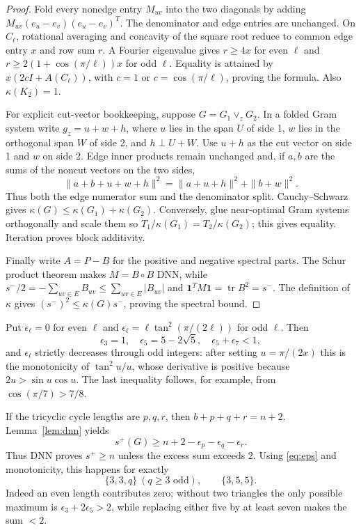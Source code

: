 \documentclass[11pt]{article}
\newcommand{\tr}{\operatorname{tr}}
\newcommand{\one}{\mathbf 1}
\begin{document}
\begin{proof}
Fold every nonedge entry $M_{uv}$ into the two diagonals by adding
$M_{uv}(e_u-e_v)(e_u-e_v)^T$.  The denominator and edge entries are
unchanged.  On $C_\ell$, rotational averaging and concavity of the square
root reduce to common edge entry $x$ and row sum $r$.  A Fourier eigenvalue
gives $r\geq4x$ for even $\ell$ and
$r\geq2(1+\cos(\pi/\ell))x$ for odd $\ell$.  Equality is attained by
$x(2cI+A(C_\ell))$, with $c=1$ or $c=\cos(\pi/\ell)$, proving the formula.
Also $\kappa(K_2)=1$.

For explicit cut-vector bookkeeping, suppose $G=G_1\vee_zG_2$.  In a folded
Gram system write $g_z=u+w+h$, where $u$ lies in the span $U$ of side 1,
$w$ lies in the orthogonal span $W$ of side 2, and $h\perp U+W$.  Use $u+h$
as the cut vector on side 1 and $w$ on side 2.  Edge inner products remain
unchanged and, if $a,b$ are the sums of the noncut vectors on the two sides,
\[
 \|a+b+u+w+h\|^2=\|a+u+h\|^2+\|b+w\|^2.
\]
Thus both the edge numerator sum and the denominator split.  Cauchy--Schwarz
gives $\kappa(G)\leq\kappa(G_1)+\kappa(G_2)$.  Conversely, glue near-optimal
Gram systems orthogonally and scale them so
$T_1/\kappa(G_1)=T_2/\kappa(G_2)$; this gives equality.  Iteration proves
block additivity.

Finally write $A=P-B$ for the positive and negative spectral parts.  The
Schur product theorem makes $M=B\circ B$ DNN, while
$s^-/2=-\sum_{uv\in E}B_{uv}\leq\sum_{uv\in E}|B_{uv}|$ and
$\one^TM\one=\tr B^2=s^-$.  The definition of $\kappa$ gives
$(s^-)^2\leq\kappa(G)s^-$, proving the spectral bound.
\end{proof}

Put $\epsilon_\ell=0$ for even $\ell$ and
$\epsilon_\ell=\ell\tan^2(\pi/(2\ell))$ for odd $\ell$.  Then
\begin{equation}\label{eq:eps}
 \epsilon_3=1,\quad \epsilon_5=5-2\sqrt5,\quad
 \epsilon_5+\epsilon_7<1,
\end{equation}
and $\epsilon_\ell$ strictly decreases through odd integers: after setting
$u=\pi/(2x)$ this is the monotonicity of $\tan^2u/u$, whose derivative is
positive because $2u>\sin u\cos u$.  The last inequality follows, for example,
from $\cos(\pi/7)>7/8$.

If the tricyclic cycle lengths are $p,q,r$, then
$b+p+q+r=n+2$.  Lemma~\ref{lem:dnn} yields
\begin{equation}\label{eq:dnn-bound}
 s^+(G)\geq n+2-\epsilon_p-\epsilon_q-\epsilon_r.
\end{equation}
Thus DNN proves $s^+\geq n$ unless the excess sum exceeds $2$.
Using \eqref{eq:eps} and monotonicity, this happens for exactly
\begin{equation}\label{eq:residual}
 \{3,3,q\}\ (q\geq3\text{ odd}),\qquad \{3,5,5\}.
\end{equation}
Indeed an even length contributes zero; without two triangles the only
possible maximum is $\epsilon_3+2\epsilon_5>2$, while replacing either five
by at least seven makes the sum $<2$.
\end{document}
